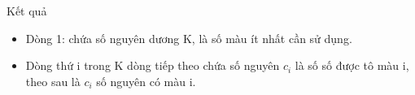 Kết quả
\begin{itemize}
	\item     Dòng 1: chứa số nguyên dương K, là số màu ít nhất cần sử dụng.   
	\item     Dòng thứ i trong K dòng tiếp theo chứa số nguyên $c_{i}$    là số số được tô màu i, theo sau là $c_{i}$    số nguyên có màu i.   
\end{itemize}